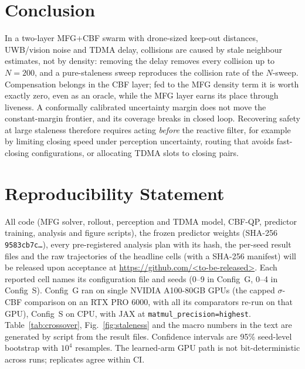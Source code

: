 \documentclass[letterpaper,10pt,journal,twoside]{IEEEtran}
\begin{document}
\section{Conclusion}
In a two-layer MFG+CBF swarm with drone-sized keep-out distances, UWB/vision noise and TDMA delay, collisions are
caused by stale neighbour estimates, not by density: removing the delay removes every collision up to $N{=}200$,
and a pure-staleness sweep reproduces the collision rate of the $N$-sweep. Compensation belongs in the CBF layer; fed
to the MFG density term it is worth exactly zero, even as an oracle, while the MFG layer earns its place through
liveness. A conformally calibrated uncertainty margin does not move the constant-margin frontier, and its coverage
breaks in closed loop. Recovering safety at large staleness therefore requires acting \emph{before} the reactive
filter, for example by limiting closing speed under perception uncertainty, routing that avoids fast-closing
configurations, or allocating TDMA slots to closing pairs.

\section*{Reproducibility Statement}
All code (MFG solver, rollout, perception and TDMA model, CBF-QP, predictor training, analysis and figure
scripts), the frozen predictor weights (SHA-256 \texttt{9583cb7c\ldots}), every pre-registered analysis plan with
its hash, the per-seed result files and the raw trajectories of the headline cells (with a SHA-256 manifest) will
be released upon acceptance at \url{https://github.com/<to-be-released>}. Each reported cell names its
configuration file and seeds (0--9 in Config~G, 0--4 in Config~S). Config~G ran on single NVIDIA A100-80GB GPUs
(the capped $\sigma$-CBF comparison on an RTX PRO 6000, with all its comparators re-run on that GPU), Config~S on
CPU, with JAX at \texttt{matmul\_precision=highest}. Table~\ref{tab:crossover}, Fig.~\ref{fig:staleness} and the
macro numbers in the text are generated by script from the result files. Confidence intervals are 95\% seed-level
bootstrap with $10^4$ resamples. The learned-arm GPU path is not bit-deterministic across runs; replicates agree
within CI.



\end{document}
